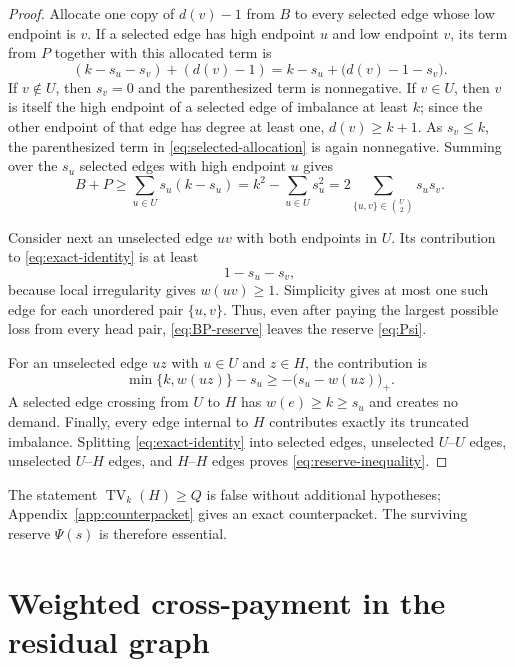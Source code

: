 \documentclass[a4paper,11pt]{amsart}
\numberwithin{equation}{section}
\theoremstyle{definition}
\theoremstyle{remark}
\newcommand{\TV}{\operatorname{TV}}
\begin{document}
\begin{proof}
Allocate one copy of $d(v)-1$ from $B$ to every selected edge whose low endpoint is $v$.  If a selected edge has high endpoint $u$ and low endpoint $v$, its term from $P$ together with this allocated term is
\begin{equation}
(k-s_u-s_v)+(d(v)-1)=k-s_u+\bigl(d(v)-1-s_v\bigr).
\label{eq:selected-allocation}
\end{equation}
If $v\notin U$, then $s_v=0$ and the parenthesized term is nonnegative.  If $v\in U$, then $v$ is itself the high endpoint of a selected edge of imbalance at least $k$; since the other endpoint of that edge has degree at least one, $d(v)\ge k+1$.  As $s_v\le k$, the parenthesized term in \eqref{eq:selected-allocation} is again nonnegative.  Summing over the $s_u$ selected edges with high endpoint $u$ gives
\begin{equation}
B+P\ge\sum_{u\in U}s_u(k-s_u)
=k^2-\sum_{u\in U}s_u^2
=2\sum_{\{u,v\}\in\binom U2}s_us_v.
\label{eq:BP-reserve}
\end{equation}

Consider next an unselected edge $uv$ with both endpoints in $U$.  Its contribution to \eqref{eq:exact-identity} is at least
\[
1-s_u-s_v,
\]
because local irregularity gives $w(uv)\ge1$.  Simplicity gives at most one such edge for each unordered pair $\{u,v\}$.  Thus, even after paying the largest possible loss from every head pair, \eqref{eq:BP-reserve} leaves the reserve \eqref{eq:Psi}.

For an unselected edge $uz$ with $u\in U$ and $z\in H$, the contribution is
\[
\min\{k,w(uz)\}-s_u
\ge-\bigl(s_u-w(uz)\bigr)_+.
\]
A selected edge crossing from $U$ to $H$ has $w(e)\ge k\ge s_u$ and creates no demand.  Finally, every edge internal to $H$ contributes exactly its truncated imbalance.  Splitting \eqref{eq:exact-identity} into selected edges, unselected $U$--$U$ edges, unselected $U$--$H$ edges, and $H$--$H$ edges proves \eqref{eq:reserve-inequality}.
\end{proof}

The statement $\TV_k(H)\ge Q$ is false without additional hypotheses; Appendix~\ref{app:counterpacket} gives an exact counterpacket.  The surviving reserve $\Psi(s)$ is therefore essential.

\section{Weighted cross-payment in the residual graph}\label{sec:cross-payment}
\end{document}
